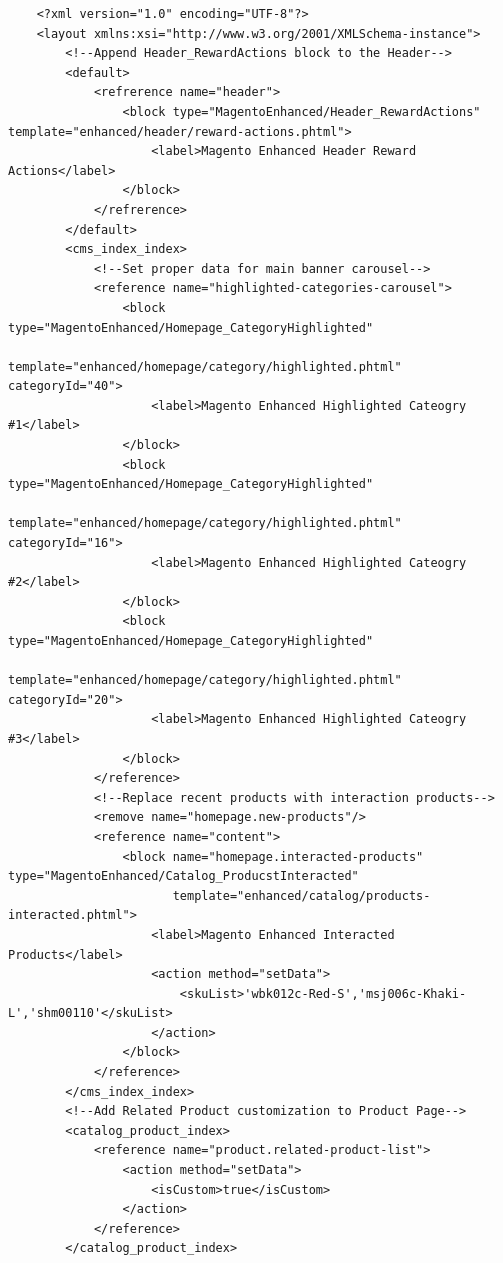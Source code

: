 \vspace{0.5cm}
\lstset{language=XML}
\begin{lstlisting} 
    <?xml version="1.0" encoding="UTF-8"?>
    <layout xmlns:xsi="http://www.w3.org/2001/XMLSchema-instance">
        <!--Append Header_RewardActions block to the Header-->
        <default>
            <refrerence name="header">
                <block type="MagentoEnhanced/Header_RewardActions" template="enhanced/header/reward-actions.phtml">
                    <label>Magento Enhanced Header Reward Actions</label>
                </block>
            </refrerence>
        </default>
        <cms_index_index>
            <!--Set proper data for main banner carousel-->
            <reference name="highlighted-categories-carousel">
                <block type="MagentoEnhanced/Homepage_CategoryHighlighted"
                       template="enhanced/homepage/category/highlighted.phtml" categoryId="40">
                    <label>Magento Enhanced Highlighted Cateogry #1</label>
                </block>
                <block type="MagentoEnhanced/Homepage_CategoryHighlighted"
                       template="enhanced/homepage/category/highlighted.phtml" categoryId="16">
                    <label>Magento Enhanced Highlighted Cateogry #2</label>
                </block>
                <block type="MagentoEnhanced/Homepage_CategoryHighlighted"
                       template="enhanced/homepage/category/highlighted.phtml" categoryId="20">
                    <label>Magento Enhanced Highlighted Cateogry #3</label>
                </block>
            </reference>
            <!--Replace recent products with interaction products-->
            <remove name="homepage.new-products"/>
            <reference name="content">
                <block name="homepage.interacted-products" type="MagentoEnhanced/Catalog_ProducstInteracted"
                       template="enhanced/catalog/products-interacted.phtml">
                    <label>Magento Enhanced Interacted Products</label>
                    <action method="setData">
                        <skuList>'wbk012c-Red-S','msj006c-Khaki-L','shm00110'</skuList>
                    </action>
                </block>
            </reference>
        </cms_index_index>
        <!--Add Related Product customization to Product Page-->
        <catalog_product_index>
            <reference name="product.related-product-list">
                <action method="setData">
                    <isCustom>true</isCustom>
                </action>
            </reference>
        </catalog_product_index>

\end{lstlisting}
